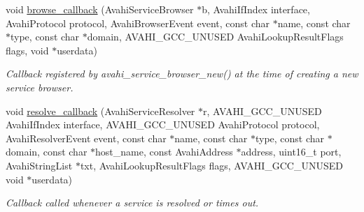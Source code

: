 \begin{DoxyCompactItemize}
void \hyperlink{avahi-discovery_8h_a2b331683eee5e4914140744a173bc068}{browse\-\_\-callback} (\-Avahi\-Service\-Browser $\ast$b, \-Avahi\-If\-Index interface, \-Avahi\-Protocol protocol, \-Avahi\-Browser\-Event event, const char $\ast$name, const char $\ast$type, const char $\ast$domain, \-A\-V\-A\-H\-I\-\_\-\-G\-C\-C\-\_\-\-U\-N\-U\-S\-E\-D \-Avahi\-Lookup\-Result\-Flags flags, void $\ast$userdata)
\begin{DoxyCompactList}\small\item\em \-Callback registered by avahi\-\_\-service\-\_\-browser\-\_\-new() at the time of creating a new service browser. \end{DoxyCompactList}\item 
void \hyperlink{avahi-discovery_8h_a9b958ff0ce85cd9792368b10d92f8076}{resolve\-\_\-callback} (\-Avahi\-Service\-Resolver $\ast$r, \-A\-V\-A\-H\-I\-\_\-\-G\-C\-C\-\_\-\-U\-N\-U\-S\-E\-D \-Avahi\-If\-Index interface, \-A\-V\-A\-H\-I\-\_\-\-G\-C\-C\-\_\-\-U\-N\-U\-S\-E\-D \-Avahi\-Protocol protocol, \-Avahi\-Resolver\-Event event, const char $\ast$name, const char $\ast$type, const char $\ast$domain, const char $\ast$host\-\_\-name, const \-Avahi\-Address $\ast$address, uint16\-\_\-t port, \-Avahi\-String\-List $\ast$txt, \-Avahi\-Lookup\-Result\-Flags flags, \-A\-V\-A\-H\-I\-\_\-\-G\-C\-C\-\_\-\-U\-N\-U\-S\-E\-D void $\ast$userdata)
\begin{DoxyCompactList}\small\item\em \-Callback called whenever a service is resolved or times out. \end{DoxyCompactList}\end{DoxyCompactItemize}
